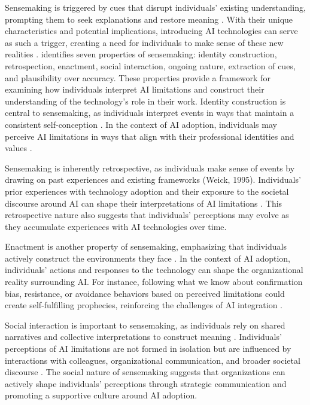 Sensemaking is triggered by cues that disrupt individuals' existing understanding, prompting them to seek explanations and restore meaning \citep{Maitlis2014}. With their unique characteristics and potential implications, introducing AI technologies can serve as such a trigger, creating a need for individuals to make sense of these new realities \citep{Yin2024}. \cite{Weick1995} identifies seven properties of sensemaking: identity construction, retrospection, enactment, social interaction, ongoing nature, extraction of cues, and plausibility over accuracy. These properties provide a framework for examining how individuals interpret AI limitations and construct their understanding of the technology's role in their work. Identity construction is central to sensemaking, as individuals interpret events in ways that maintain a consistent self-conception \citep{Weick1995}. In the context of AI adoption, individuals may perceive AI limitations in ways that align with their professional identities and values \citep{Choudhary2024}.

Sensemaking is inherently retrospective, as individuals make sense of events by drawing on past experiences and existing frameworks (Weick, 1995). Individuals' prior experiences with technology adoption and their exposure to the societal discourse around AI can shape their interpretations of AI limitations \citep{Agarwal1998,Trenerry2021}. This retrospective nature also suggests that individuals' perceptions may evolve as they accumulate experiences with AI technologies over time.

Enactment is another property of sensemaking, emphasizing that individuals actively construct the environments they face \citep{Weick1995}. In the context of AI adoption, individuals' actions and responses to the technology can shape the organizational reality surrounding AI. For instance, following what we know about confirmation bias, resistance, or avoidance behaviors based on perceived limitations could create self-fulfilling prophecies, reinforcing the challenges of AI integration \citep{Peters2022}.

Social interaction is important to sensemaking, as individuals rely on shared narratives and collective interpretations to construct meaning \citep{Weick1995}. Individuals' perceptions of AI limitations are not formed in isolation but are influenced by interactions with colleagues, organizational communication, and broader societal discourse \citep{Agarwal1998,Trenerry2021}. The social nature of sensemaking suggests that organizations can actively shape individuals' perceptions through strategic communication and promoting a supportive culture around AI adoption.

